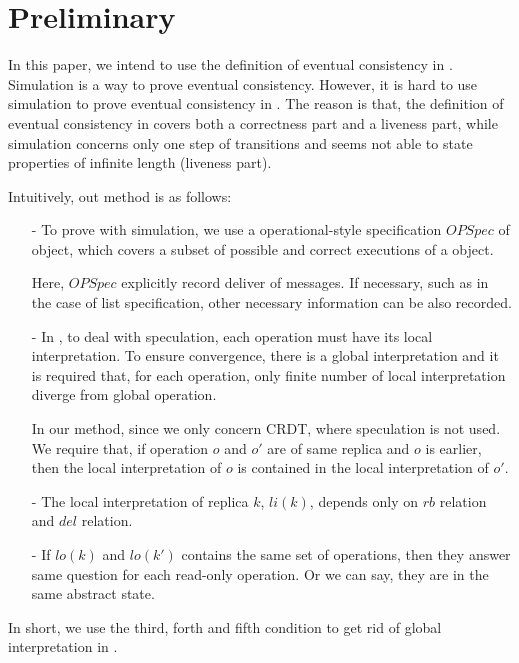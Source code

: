 
\section{Preliminary}
\label{sec:preliminary}

In this paper, we intend to use the definition of eventual consistency in \cite{Bouajjani:2014}. Simulation is a way to prove eventual consistency. However, it is hard to use simulation to prove eventual consistency in \cite{Bouajjani:2014}. The reason is that, the definition of eventual consistency in \cite{Bouajjani:2014} covers both a correctness part and a liveness part, while simulation concerns only one step of transitions and seems not able to state properties of infinite length (liveness part).

Intuitively, out method is as follows:

\begin{itemize}
\setlength{\itemsep}{0.5pt}
\item[-] To prove with simulation, we use a operational-style specification $\textit{OPSpec}$ of object, which covers a subset of possible and correct executions of a object.

Here, $\textit{OPSpec}$ explicitly record deliver of messages. If necessary, such as in the case of list specification, other necessary information can be also recorded.

\item[-] In \cite{Bouajjani:2014}, to deal with speculation, each operation must have its local interpretation. To ensure convergence, there is a global interpretation and it is required that, for each operation, only finite number of local interpretation diverge from global operation.

    In our method, since we only concern CRDT, where speculation is not used. We require that, if operation $o$ and $o'$ are of same replica and $o$ is earlier, then the local interpretation of $o$ is contained in the local interpretation of $o'$.

\item[-] The local interpretation of replica $k$, $li(k)$, depends only on $rb$ relation and $del$ relation.

\item[-] If $lo(k)$ and $lo(k')$ contains the same set of operations, then they answer same question for each read-only operation. Or we can say, they are in the same abstract state.
\end{itemize}

In short, we use the third, forth and fifth condition to get rid of global interpretation in \cite{Bouajjani:2014}.



